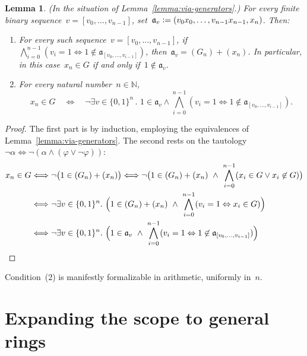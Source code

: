 \documentclass[com,11pt,crcready]{iosart2x}
\theoremstyle{definition}
\theoremstyle{plain}
\newtheorem{lemma}[definition]{Lemma}
\theoremstyle{remark}
\newcommand{\aaa}{\mathfrak{a}}
\newcommand{\NN}{\mathbb{N}}
\newcommand{\defeq}{\vcentcolon=}
\renewcommand{\_}{\mathpunct{.}\,}
\begin{document}
\begin{lemma}\label{lemma:uniform-char}(In the situation of Lemma~\ref{lemma:via-generators}.)
For every finite binary sequence~$v = [v_0,\ldots,v_{n-1}]$, set~$\aaa_v
\defeq (v_0x_0,\ldots,v_{n-1}x_{n-1},x_n)$. Then:
\begin{enumerate}
\item For every such sequence~$v = [v_0,\ldots,v_{n-1}]$, if
$\bigwedge_{i=0}^{n-1} (v_i = 1 \Leftrightarrow 1 \not\in \aaa_{[v_0,\ldots,v_{i-1}]})$,
then~$\aaa_v = (G_n) + (x_n)$.
In particular, in this case~$x_n \in G$ if and only if~$1 \not\in \aaa_v$.
\item For every natural number~$n \in \NN$,
\vspace*{-1.2em}
\[ x_n \in G \quad\Longleftrightarrow\quad \neg
  \exists v \in \{0,1\}^n\_
    1 \in \aaa_v \wedge
      \bigwedge_{i=0}^{n-1} (v_i = 1 \Leftrightarrow 1 \not\in \aaa_{[v_0,\ldots,v_{i-1}]}). \]
\end{enumerate}
\end{lemma}

\begin{proof}\belowdisplayskip=-18pt The first part is by induction, employing the equivalences of
Lemma~\ref{lemma:via-generators}. The second rests on the tautology
$\neg\alpha \Longleftrightarrow \neg(\alpha \wedge (\varphi \vee \neg\varphi))$:
\begin{align*}
  x_n \in G &
  \Longleftrightarrow \neg\bigl(1 \in (G_n) + (x_n)\bigr)
  \Longleftrightarrow \neg\bigl(1 \in (G_n) + (x_n) \ \wedge\ \bigwedge_{i=0}^{n-1} (x_i \in G \vee x_i \not\in G)\bigr) \\
  & \Longleftrightarrow \neg\exists v \in \{0,1\}^n\_
    \Bigl(1 \in (G_n) + (x_n) \ \wedge\ \bigwedge_{i=0}^{n-1} (v_i = 1
    \Leftrightarrow x_i \in G)\Bigr) \\
  & \Longleftrightarrow \neg\exists v \in \{0,1\}^n\_
    \Bigl(1 \in \aaa_v \ \wedge\ \bigwedge_{i=0}^{n-1} (v_i = 1
    \Leftrightarrow 1 \not\in \aaa_{[v_0,\ldots,v_{i-1}]})\Bigr)
\end{align*}
\end{proof}

\noindent
Condition~(2) is manifestly formalizable in
arithmetic, uniformly in~$n$.


\section{Expanding the scope to general rings}
\label{sect:wlog}
\end{document}
